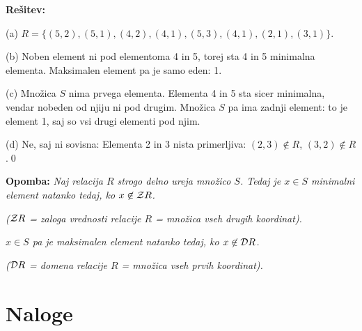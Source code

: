 \documentclass[11pt,paper=b5,footinclude,headinclude]{scrbook} %
\begin{document}
\textbf{Rešitev:}

(a) $R = \{(5,2),(5,1),(4,2),(4,1),(5,3),(4,1),(2,1),(3,1)\}$.

(b) Noben element ni pod elementoma 4 in 5, torej sta 4 in 5 minimalna elementa.
Maksimalen element pa je samo eden: 1.

(c) Množica $S$ nima prvega elementa. Elementa 4 in 5 sta sicer minimalna, vendar nobeden
od njiju ni pod drugim. Množica $S$ pa ima zadnji element: to je element 1, saj so vsi drugi elementi
pod njim.

(d) Ne, saj ni sovisna: Elementa 2 in 3 nista primerljiva: $(2,3)\not\in R$, $(3,2)\not\in R$.\qed

\bigskip
\textbf{Opomba:} \emph{Naj relacija $R$ strogo delno ureja množico $S$.
Tedaj je $x\in S$ minimalni element natanko tedaj, ko $x\not\in {\cal Z}R$.}

\emph{(${\cal Z}R$ = zaloga vrednosti relacije $R$ = množica vseh drugih koordinat).}

\emph{$x\in S$ pa je maksimalen element natanko tedaj, ko $x\not\in {\cal D}R$.}

\emph{(${\cal D}R$ = domena relacije $R$ = množica vseh prvih koordinat).}

\section{Naloge}
\end{document}

